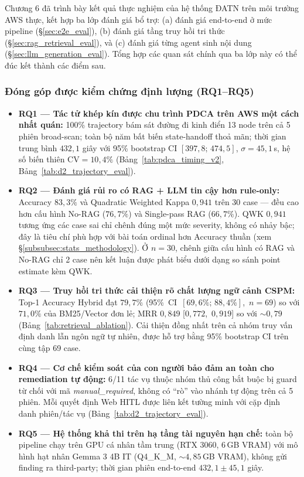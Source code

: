 Chương 6 đã trình bày kết quả thực nghiệm của hệ thống ĐATN trên môi trường AWS thực, kết hợp ba lớp đánh giá bổ trợ: (a) đánh giá end-to-end ở mức pipeline (\S\ref{sec:e2e_eval}), (b) đánh giá tầng truy hồi tri thức (\S\ref{sec:rag_retrieval_eval}), và (c) đánh giá từng agent sinh nội dung (\S\ref{sec:llm_generation_eval}). Tổng hợp các quan sát chính qua ba lớp này có thể đúc kết thành các điểm sau.

\subsubsection*{Đóng góp được kiểm chứng định lượng (RQ1--RQ5)}
\begin{itemize}
  \item \textbf{RQ1 --- Tác tử khép kín được chu trình PDCA trên AWS một cách nhất quán:} 100\% trajectory bám sát đường đi kinh điển 13 node trên cả 5 phiên broad-scan; toàn bộ năm bất biến state-handoff thoả mãn; thời gian trung bình $432{,}1$ giây với 95\% bootstrap CI \mbox{$[397{,}8;\,474{,}5]$}, $\sigma = 45{,}1$\,s, hệ số biến thiên $\text{CV} = 10{,}4\%$ (Bảng~\ref{tab:pdca_timing_v2}, Bảng~\ref{tab:d2_trajectory_eval}).
  \item \textbf{RQ2 --- Đánh giá rủi ro có RAG + LLM tin cậy hơn rule-only:} Accuracy $83{,}3\%$ và Quadratic Weighted Kappa $0{,}941$ trên 30 case --- đều cao hơn cấu hình No-RAG ($76{,}7\%$) và Single-pass RAG ($66{,}7\%$). QWK $0{,}941$ tương ứng các case sai chỉ chênh đúng một mức severity, không có nhảy bậc; đây là tiêu chí phù hợp với bài toán ordinal hơn Accuracy thuần (xem \S\ref{subsubsec:stats_methodology}). Ở $n=30$, chênh giữa cấu hình có RAG và No-RAG chỉ 2 case nên kết luận được phát biểu dưới dạng so sánh point estimate kèm QWK.
  \item \textbf{RQ3 --- Truy hồi tri thức cải thiện rõ chất lượng ngữ cảnh CSPM:} Top-1 Accuracy Hybrid đạt $79{,}7\%$ \mbox{(95\% CI $[69{,}6\%;\,88{,}4\%]$, $n=69$)} so với $71{,}0\%$ của BM25/Vector đơn lẻ; MRR $0{,}849$ \mbox{[$0{,}772$, $0{,}919$]} so với $\sim 0{,}79$ (Bảng~\ref{tab:retrieval_ablation}). Cải thiện đồng nhất trên cả nhóm truy vấn định danh lẫn ngôn ngữ tự nhiên, được hỗ trợ bằng 95\% bootstrap CI trên cùng tập 69 case.
  \item \textbf{RQ4 --- Cơ chế kiểm soát của con người bảo đảm an toàn cho remediation tự động:} 6/11 tác vụ thuộc nhóm thủ công bắt buộc bị guard từ chối với mã \textit{manual\_required}, không có ``rò'' vào nhánh tự động trên cả 5 phiên. Mỗi quyết định Web HITL được liên kết tường minh với cặp định danh phiên/tác vụ (Bảng~\ref{tab:d2_trajectory_eval}).
  \item \textbf{RQ5 --- Hệ thống khả thi trên hạ tầng tài nguyên hạn chế:} toàn bộ pipeline chạy trên GPU cá nhân tầm trung (RTX 3060, 6\,GB VRAM) với mô hình hạt nhân Gemma 3 4B IT (Q4\_K\_M, $\sim 4{,}85$\,GB VRAM), không gửi finding ra third-party; thời gian phiên end-to-end $432{,}1 \pm 45{,}1$ giây.
\end{itemize}

